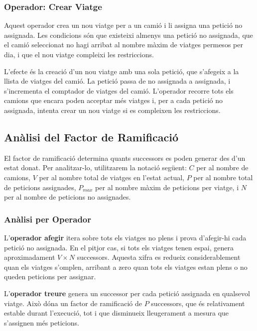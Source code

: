 \vspace{0.5cm}

\subsubsection{Operador: Crear Viatge}

Aquest operador crea un nou viatge per a un camió i li assigna una petició no assignada. Les condicions són que existeixi almenys una petició no assignada, que el camió seleccionat no hagi arribat al nombre màxim de viatges permesos per dia, i que el nou viatge compleixi les restriccions.

L'efecte és la creació d'un nou viatge amb una sola petició, que s'afegeix a la llista de viatges del camió. La petició passa de no assignada a assignada, i s'incrementa el comptador de viatges del camió. L'operador recorre tots els camions que encara poden acceptar més viatges i, per a cada petició no assignada, intenta crear un nou viatge si es compleixen les restriccions.

\vspace{0.5cm}

\subsection{Anàlisi del Factor de Ramificació}

El factor de ramificació determina quants successors es poden generar des d'un estat donat. Per analitzar-lo, utilitzarem la notació següent: $C$ per al nombre de camions, $V$ per al nombre total de viatges en l'estat actual, $P$ per al nombre total de peticions assignades, $P_{max}$ per al nombre màxim de peticions per viatge, i $N$ per al nombre de peticions no assignades.

\vspace{0.5cm}

\subsubsection{Anàlisi per Operador}

L'\textbf{operador afegir} itera sobre tots els viatges no plens i prova d'afegir-hi cada petició no assignada. En el pitjor cas, si tots els viatges tenen espai, genera aproximadament $V \times N$ successors. Aquesta xifra es redueix considerablement quan els viatges s'omplen, arribant a zero quan tots els viatges estan plens o no queden peticions per assignar.

\vspace{0.5em}  
L'\textbf{operador treure} genera un successor per cada petició assignada en qualsevol viatge. Això dóna un factor de ramificació de $P$ successors, que és relativament estable durant l'execució, tot i que disminueix lleugerament a mesura que s'assignen més peticions.\\[0.5em] 

